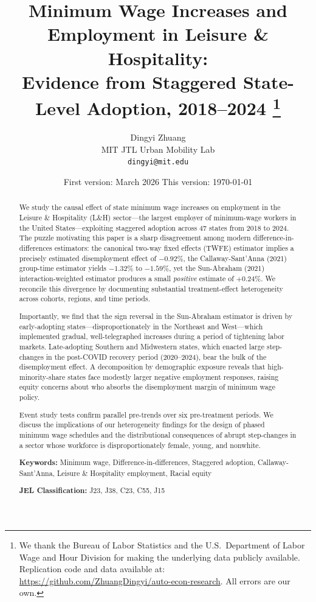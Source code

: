 \documentclass[12pt]{article}
\title{\Large\textbf{Minimum Wage Increases and Employment in Leisure \&
  Hospitality:\\
  Evidence from Staggered State-Level Adoption, 2018--2024}%
  \thanks{
    We thank the Bureau of Labor Statistics and the U.S.\ Department of Labor
    Wage and Hour Division for making the underlying data publicly available.
    Replication code and data available at: \url{https://github.com/ZhuangDingyi/auto-econ-research}.
    All errors are our own.
  }
}
\author{
  Dingyi Zhuang \\
  \small{MIT JTL Urban Mobility Lab} \\
  \small{\texttt{dingyi@mit.edu}}
}
\date{\small{First version: March 2026 \quad This version: \today}}
\begin{document}
\maketitle

\begin{abstract}
\noindent
We study the causal effect of state minimum wage increases on employment in
the Leisure \& Hospitality (L\&H) sector---the largest employer of minimum-wage
workers in the United States---exploiting staggered adoption across 47 states
from 2018 to 2024.  The puzzle motivating this paper is a sharp disagreement
among modern difference-in-differences estimators: the canonical two-way fixed
effects (TWFE) estimator implies a precisely estimated disemployment effect of
$-0.92\%$, the Callaway-Sant'Anna (2021) group-time estimator yields $-1.32\%$
to $-1.59\%$, yet the Sun-Abraham (2021) interaction-weighted estimator
produces a small \emph{positive} estimate of $+0.24\%$.  We reconcile this
divergence by documenting substantial treatment-effect heterogeneity across
cohorts, regions, and time periods.

Importantly, we find that the sign reversal in the Sun-Abraham estimator is
driven by early-adopting states---disproportionately in the Northeast and
West---which implemented gradual, well-telegraphed increases during a period of
tightening labor markets.  Late-adopting Southern and Midwestern states, which
enacted large step-changes in the post-COVID recovery period (2020--2024),
bear the bulk of the disemployment effect.  A decomposition by demographic
exposure reveals that high-minority-share states face modestly larger negative
employment responses, raising equity concerns about who absorbs the
disemployment margin of minimum wage policy.

Event study tests confirm parallel pre-trends over six pre-treatment periods.
We discuss the implications of our heterogeneity findings for the design of
phased minimum wage schedules and the distributional consequences of abrupt
step-changes in a sector whose workforce is disproportionately female, young,
and nonwhite.

\medskip
\noindent\textbf{Keywords:}
Minimum wage, Difference-in-differences, Staggered adoption,
Callaway-Sant'Anna, Leisure \& Hospitality employment, Racial equity

\medskip
\noindent\textbf{JEL Classification:} J23, J38, C23, C55, J15
\end{abstract}

\newpage
\end{document}
